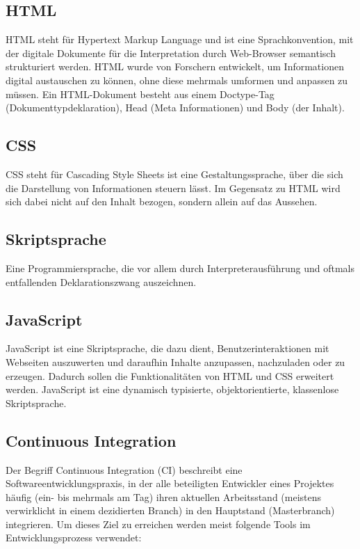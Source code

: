    \subsection{HTML}
    HTML steht für Hypertext Markup Language und ist eine Sprachkonvention, mit 
    der digitale Dokumente für die Interpretation durch Web-Browser semantisch 
    strukturiert werden. HTML wurde von Forschern entwickelt, um Informationen 
    digital austauschen zu können, ohne diese mehrmals umformen und anpassen zu 
    müssen. Ein HTML-Dokument besteht aus einem Doctype-Tag 
    (Dokumenttypdeklaration), Head 
    (Meta Informationen) und Body (der Inhalt).

    \subsection{CSS}
    CSS steht für Cascading Style Sheets ist eine Gestaltungssprache, über die 
    sich die Darstellung von Informationen steuern lässt. Im Gegensatz zu HTML 
    wird sich dabei nicht auf den Inhalt bezogen, sondern allein auf das Aussehen.

    \subsection{Skriptsprache}
    Eine Programmiersprache, die vor allem durch Interpreterausführung und oftmals 
    entfallenden Deklarationszwang auszeichnen.


    \subsection{JavaScript}
    JavaScript ist eine Skriptsprache, die dazu dient, Benutzerinteraktionen mit 
    Webseiten auszuwerten und daraufhin Inhalte anzupassen, nachzuladen oder zu 
    erzeugen. Dadurch sollen die Funktionalitäten von HTML und CSS erweitert 
    werden. JavaScript ist eine dynamisch typisierte, objektorientierte, 
    klassenlose Skriptsprache.

    \subsection{Continuous Integration}
    Der Begriff Continuous Integration (CI) beschreibt eine Softwareentwicklungspraxis, in der alle beteiligten Entwickler eines Projektes häufig (ein- bis mehrmals am Tag) ihren aktuellen Arbeitsstand (meistens verwirklicht in einem dezidierten Branch) in den Hauptstand (Masterbranch)
    integrieren. Um dieses Ziel zu erreichen werden meist folgende Tools im Entwicklungsprozess verwendet:

